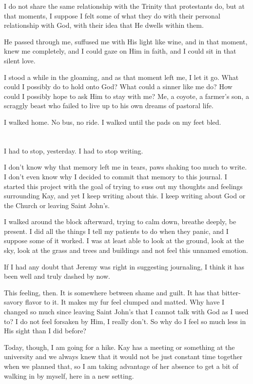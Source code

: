 I do not share the same relationship with the Trinity that protestants do, but at that moments, I suppose I felt some of what they do with their personal relationship with God, with their idea that He dwells within them.

He passed through me, suffused me with His light like wine, and in that moment, knew me completely, and I could gaze on Him in faith, and I could sit in that silent love.

I stood a while in the gloaming, and as that moment left me, I let it go. What could I possibly do to hold onto God? What could a sinner like me do? How could I possibly hope to ask Him to stay with me? Me, a coyote, a farmer's son, a scraggly beast who failed to live up to his own dreams of pastoral life.

I walked home. No bus, no ride. I walked until the pads on my feet bled.

\section{}

I had to stop, yesterday. I had to stop writing.

I don't know why that memory left me in tears, paws shaking too much to write. I don't even know why I decided to commit that memory to this journal. I started this project with the goal of trying to suss out my thoughts and feelings surrounding Kay, and yet I keep writing about this. I keep writing about God or the Church or leaving Saint John's.

I walked around the block afterward, trying to calm down, breathe deeply, be present. I did all the things I tell my patients to do when they panic, and I suppose some of it worked. I was at least able to look at the ground, look at the sky, look at the grass and trees and buildings and not feel this unnamed emotion.

If I had any doubt that Jeremy was right in suggesting journaling, I think it has been well and truly dashed by now.

This feeling, then. It is somewhere between shame and guilt. It has that bitter-savory flavor to it. It makes my fur feel clumped and matted. Why have I changed so much since leaving Saint John's that I cannot talk with God as I used to? I do not feel forsaken by Him, I really don't. So why do I feel so much less in His sight than I did before?

Today, though, I am going for a hike. Kay has a meeting or something at the university and we always knew that it would not be just constant time together when we planned that, so I am taking advantage of her absence to get a bit of walking in by myself, here in a new setting.

